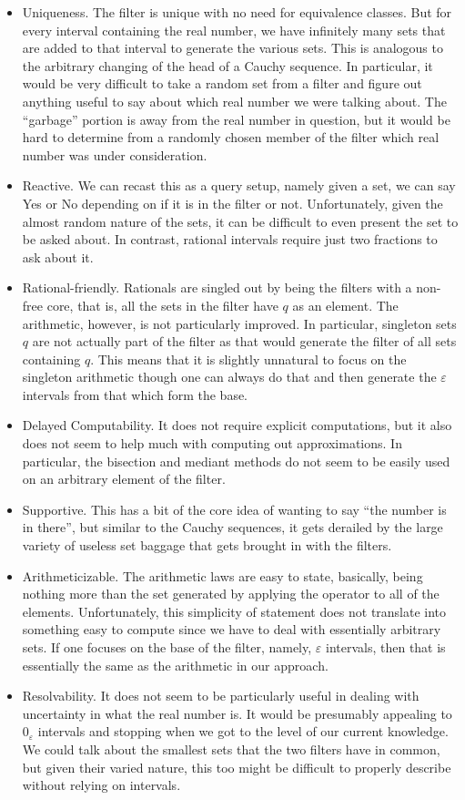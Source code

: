 \documentclass[12pt]{article}
\begin{document}
\begin{itemize}
    \item Uniqueness. The filter is unique with no need for equivalence classes. But for every interval containing the real number, we have infinitely many sets that are added to that interval to generate the various sets. This is analogous to the arbitrary changing of the head of a Cauchy sequence. In particular, it would be very difficult to take a random set from a filter and figure out anything useful to say about which real number we were talking about. The ``garbage'' portion is away from the real number in question, but it would be hard to determine from a randomly chosen member of the filter which real number was under consideration. 
    \item Reactive. We can recast this as a query setup, namely given a set, we can say Yes or No depending on if it is in the filter or not. Unfortunately, given the almost random nature of the sets, it can be difficult to even present the set to be asked about. In contrast, rational intervals require just two fractions to ask about it. 
    \item Rational-friendly. Rationals are singled out by being the filters with a non-free core, that is, all the sets in the filter have $q$ as an element. The arithmetic, however, is not particularly improved. In particular, singleton sets $q$ are not actually part of the filter as that would generate the filter of all sets containing $q$. This means that it is slightly unnatural to focus on the singleton arithmetic though one can always do that and then generate the $\varepsilon$ intervals from that which form the base. 
    \item Delayed Computability. It does not require explicit computations, but it also does not seem to help much with computing out approximations. In particular, the bisection and mediant methods do not seem to be easily used on an arbitrary element of the filter. 
    \item Supportive. This has a bit of the core idea of wanting to say ``the number is in there'', but similar to the Cauchy sequences, it gets derailed by the large variety of useless set baggage that gets brought in with the filters. 
    \item Arithmeticizable. The arithmetic laws are easy to state, basically, being nothing more than the set generated by applying the operator to all of the elements. Unfortunately, this simplicity of statement does not translate into something easy to compute since we have to deal with essentially arbitrary sets. If one focuses on the base of the filter, namely, $\varepsilon$ intervals, then that is essentially the same as the arithmetic in our approach. 
    \item Resolvability. It does not seem to be particularly useful in dealing with uncertainty in what the real number is. It would be presumably appealing to $0_{\varepsilon}$ intervals and stopping when we got to the level of our current knowledge. We could talk about the smallest sets that the two filters have in common, but given their varied nature, this too might be difficult to properly describe without relying on intervals.  
\end{itemize}
\end{document}
